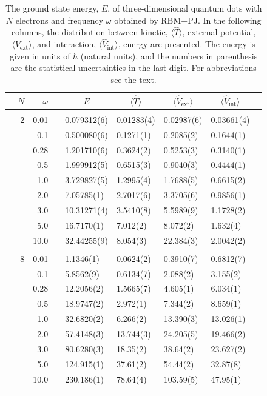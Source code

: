 \begin{table}[H]
	\caption{The ground state energy, $E$, of three-dimensional quantum dots with $N$ electrons and frequency $\omega$ obtained by RBM+PJ. In the following columns, the distribution between kinetic, $\langle\hat{T}\rangle$, external potential, $\langle\hat{V}_{\text{ext}}\rangle$, and interaction, $\langle\hat{V}_{\text{int}}\rangle$, energy are presented. The energy is given in units of $\hbar$ (natural units), and the numbers in parenthesis are the statistical uncertainties in the last digit. For abbreviations see the text.}
	\label{tab:splitfrequencyQDRBMPJ3D}
	\begin{tabularx}{\textwidth}{R{1cm}rrcR{2.3cm}R{2.3cm}R{2.3cm}R{2.3cm}R{1cm}} \hline\hline
		\makecell{\\ \phantom{$N$}} & $N$ & $\omega$ &&  &  &  &  & \\ \hline \\
		&2 & 0.01 && 0.079312(6) & 0.01283(4) & 0.02987(6) & 0.03661(4) \\
		&& 0.1 && 0.500080(6) & 0.1271(1) & 0.2085(2) & 0.1644(1) \\
		&& 0.28 && 1.201710(6) & 0.3624(2) & 0.5253(3) & 0.3140(1) \\
		&& 0.5 && 1.999912(5) & 0.6515(3) & 0.9040(3) & 0.4444(1) \\
		&& 1.0 && 3.729827(5) & 1.2995(4) & 1.7688(5) & 0.6615(2) \\
		&& 2.0 && 7.05785(1) & 2.7017(6) & 3.3705(6) & 0.9856(1) \\
		&& 3.0 && 10.31271(4) & 3.5410(8) & 5.5989(9) & 1.1728(2) \\ 
		&& 5.0 && 16.7170(1) & 7.012(2) & 8.072(2) & 1.632(4) \\
		&& 10.0 && 32.44255(9) & 8.054(3) & 22.384(3) & 2.0042(2) \\
		\hline \\
		
		&8 & 0.01 && 1.1346(1) & 0.0624(2) & 0.3910(7) & 0.6812(7) \\
		&& 0.1 && 5.8562(9) & 0.6134(7) & 2.088(2) & 3.155(2) \\
		&& 0.28 && 12.2056(2) & 1.5665(7) & 4.605(1) & 6.034(1) \\
		&& 0.5 && 18.9747(2) & 2.972(1) & 7.344(2) & 8.659(1) \\
		&& 1.0 && 32.6820(2) & 6.266(2) & 13.390(3) & 13.026(1) \\
		&& 2.0 && 57.4148(3) & 13.744(3) & 24.205(5) & 19.466(2) \\
		&& 3.0 && 80.6280(3) & 18.35(2) & 38.64(2) & 23.627(2) \\ 
		&& 5.0 && 124.915(1) & 37.61(2) & 54.44(2) & 32.87(8) \\
		&& 10.0 && 230.186(1) & 78.64(4) & 103.59(5) & 47.95(1) \\
		\hline \\
		

\end{tabularx}
\end{table}
